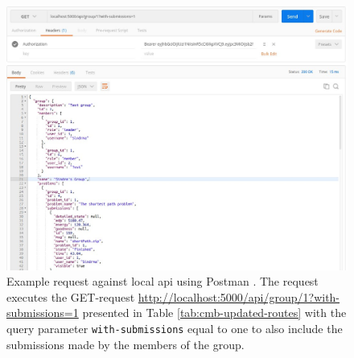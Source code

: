 \begin{figure}[h!]
    \centering
    \includegraphics[width=1.0\textwidth]{figs/postman_request.jpg}
    \caption[Example request against local API]{Example request against local \gls{api} using Postman \cite{POSTMAN}. The request executes the GET-request \url{http://localhost:5000/api/group/1?with-submissions=1} presented in Table \ref{tab:cmb-updated-routes} with the query parameter \texttt{with-submissions} equal to one to also include the submissions made by the members of the group.}
    \label{fig:postman-request}
\end{figure}

